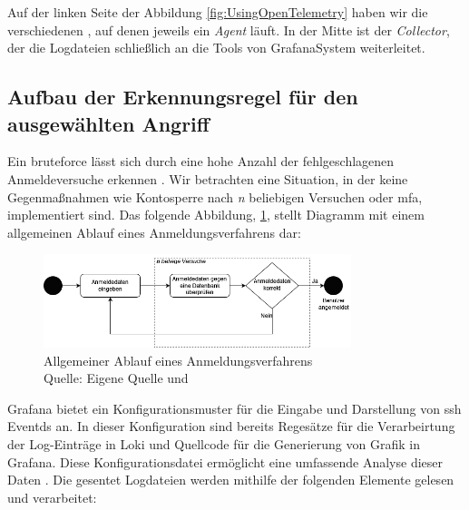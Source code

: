 Auf der linken Seite der Abbildung \ref{fig:UsingOpenTelemetry} haben wir die verschiedenen , auf denen jeweils ein \textit{Agent} läuft. In der Mitte ist der \textit{Collector}, der die Logdateien schließlich an die Tools von \gls{GrafanaSystem} weiterleitet.

\newpage
\subsection{Aufbau der Erkennungsregel für den ausgewählten Angriff}
Ein \gls{bruteforce} lässt sich durch eine hohe Anzahl der fehlgeschlagenen Anmeldeversuche erkennen \citep{Selvaganesh_SplunkBruteForce}. Wir betrachten eine Situation, in der keine Gegenmaßnahmen wie Kontosperre nach \textit{n} beliebigen Versuchen oder \gls{mfa}, implementiert sind. Das folgende Abbildung, \ref{fig:Aktivitaetsdiagramm_Anmeldung}, stellt Diagramm mit einem allgemeinen Ablauf eines Anmeldungsverfahrens dar:

\begin{figure}[H]
   \centering
   \includegraphics[width=0.8\textwidth]{assets/Anmeldeverfahren.drawio.png}
   \caption[Allgemeiner Ablauf eines Anmeldungsverfahrens]
   {Allgemeiner Ablauf eines Anmeldungsverfahrens \\Quelle: Eigene Quelle und \citep{Selvaganesh_SplunkBruteForce}}
   \label{fig:Aktivitaetsdiagramm_Anmeldung}
   \centering
\end{figure}

Grafana bietet ein Konfigurationsmuster für die Eingabe und Darstellung von \gls{ssh} Eventds an. In dieser Konfiguration sind bereits Regesätze für die 
Verarbeirtung der Log-Einträge in Loki und Quellcode für die Generierung von Grafik in Grafana. Diese Konfigurationsdatei ermöglicht eine umfassende Analyse dieser Daten \citep{VoidQuark_sshlogs}. Die gesentet Logdateien werden mithilfe der folgenden Elemente gelesen und verarbeitet:



